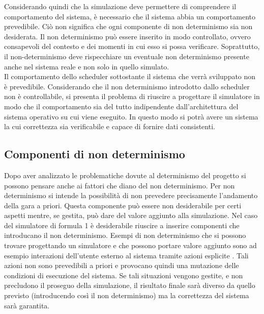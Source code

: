 Considerando quindi che la simulazione deve permettere di comprendere il
comportamento del sistema, è necessario che il sistema abbia 
un comportamento prevedibile. Ciò non significa che ogni componente di non
determinismo sia non desiderata. Il non determinismo
può essere inserito in modo controllato, ovvero consapevoli del contesto e dei
momenti in cui esso si possa verificare. Soprattutto,
il non-determinismo deve rispecchiare un eventuale non determinismo presente
anche nel sistema reale e non solo in quello simulato.\\
Il comportamento dello scheduler sottostante il sistema che verrà sviluppato non
è prevedibile. Considerando che il non determinismo
introdotto dallo scheduler non è controllabile, si presenta
il problema di riuscire a progettare il simulatore in modo
che il comportamento sia del tutto indipendente dall'architettura del sistema
operativo su cui viene eseguito. In questo
modo si potrà avere un sistema la cui correttezza sia verificabile e capace di
fornire dati consistenti.
\subsection{Componenti di non determinismo }
\label{non_determinismo}
Dopo aver analizzato le problematiche dovute al determinismo del progetto si
possono pensare anche ai fattori che diano del non determinismo.
Per non determinismo si intende la possibilit\`{a} di non prevedere precisamente
l'andamento della gara a priori. Questa componente pu\`{o} essere non
desiderabile per certi aspetti mentre, se gestita, pu\`{o} dare del valore
aggiunto alla simulazione. Nel caso del simulatore di formula 1 \`{e} desiderabile
riuscire a inserire componenti che introducano il non determinismo.
Esempi di non determinismo che si possono trovare progettando un simulatore e
che possono portare valore aggiunto sono ad esempio interazioni dell'utente
esterno al sistema tramite azioni esplicite . Tali azioni non sono prevedibili
a priori e provocano quindi una mutazione delle condizioni di esecuzione del 
sistema. Se tali situazioni vengono gestite, e non precludono il proseguo
della simulazione, il risultato finale sarà diverso da quello previsto (introducendo
così il non determinismo) ma la correttezza del sistema sarà garantita.
